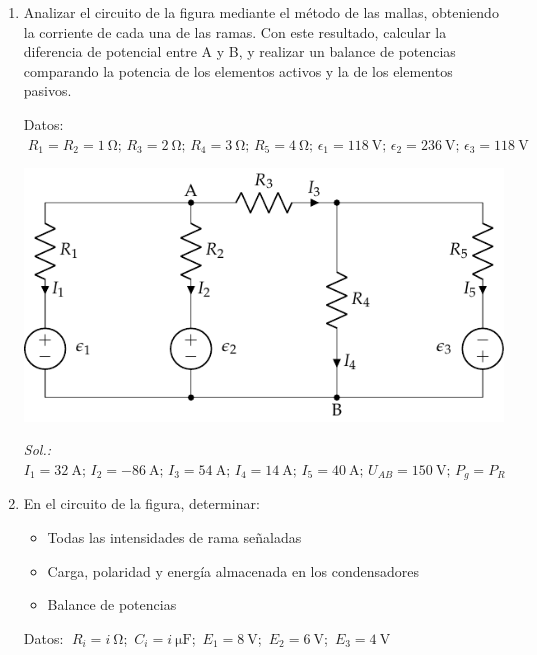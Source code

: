 \begin{enumerate}
\item Analizar el circuito de la figura mediante el método de las mallas, obteniendo la corriente de cada una de las ramas. Con este resultado, calcular la diferencia de potencial entre A y B, y realizar un balance de potencias comparando la potencia de los elementos activos y la de los elementos pasivos. 

Datos: $\; R_1 = R_2 = \qty{1}{\ohm};\, R_3 = \qty{2}{\ohm};\, R_4 = \qty{3}{\ohm};\, R_5=\qty{4}{\ohm};\, \epsilon_1=\qty{118}{\volt};\, \epsilon_2 = \qty{236}{\volt};\, \epsilon_3 = \qty{118}{\volt}$\\

  \begin{center}
    \includegraphics{../figs/mallas2.pdf}
  \end{center}

 \emph{Sol.:\;
    $I_1 = \qty{32}{\ampere};\, I_2 = \qty{-86}{\ampere};\, I_3 =\qty{54}{\ampere};\, I_4 = \qty{14}{\ampere};\, I_5 = \qty{40}{\ampere};\,
    U_{AB}=\qty{150}{\volt};\, P_g = P_R$}
 	
\item En el circuito de la figura, determinar:
  \begin{itemize}
  \item Todas las intensidades de rama señaladas
  \item Carga, polaridad y energía almacenada en los condensadores
  \item Balance de potencias
  \end{itemize}
    Datos: $\; R_i = \qty[parse-numbers=false]{i}{\ohm}$;\, $C_i = \qty[parse-numbers=false]{i}{\micro\farad}$;\, $E_1 = \qty{8}{\volt}$;\, $E_2 = \qty{6}{\volt}$;\, $E_3 = \qty{4}{\volt}$


\end{enumerate}
